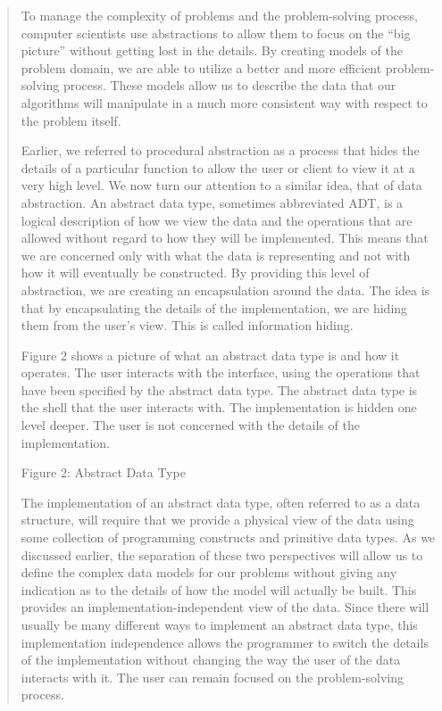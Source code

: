 \begin{quotation}
	
	To manage the complexity of problems and the problem-solving process, computer scientists use abstractions to allow them to focus on the “big picture” without getting lost in the details. By creating models of the problem domain, we are able to utilize a better and more efficient problem-solving process. These models allow us to describe the data that our algorithms will manipulate in a much more consistent way with respect to the problem itself.
	
	Earlier, we referred to procedural abstraction as a process that hides the details of a particular function to allow the user or client to view it at a very high level. We now turn our attention to a similar idea, that of data abstraction. An abstract data type, sometimes abbreviated ADT, is a logical description of how we view the data and the operations that are allowed without regard to how they will be implemented. This means that we are concerned only with what the data is representing and not with how it will eventually be constructed. By providing this level of abstraction, we are creating an encapsulation around the data. The idea is that by encapsulating the details of the implementation, we are hiding them from the user’s view. This is called information hiding.
	
	Figure 2 shows a picture of what an abstract data type is and how it operates. The user interacts with the interface, using the operations that have been specified by the abstract data type. The abstract data type is the shell that the user interacts with. The implementation is hidden one level deeper. The user is not concerned with the details of the implementation.

	
	Figure 2: Abstract Data Type
	
	The implementation of an abstract data type, often referred to as a data structure, will require that we provide a physical view of the data using some collection of programming constructs and primitive data types. As we discussed earlier, the separation of these two perspectives will allow us to define the complex data models for our problems without giving any indication as to the details of how the model will actually be built. This provides an implementation-independent view of the data. Since there will usually be many different ways to implement an abstract data type, this implementation independence allows the programmer to switch the details of the implementation without changing the way the user of the data interacts with it. The user can remain focused on the problem-solving process.

\end{quotation}

